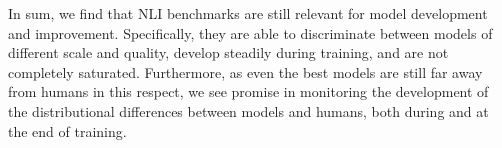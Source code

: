 In sum, we find that NLI benchmarks are still relevant for model development and improvement.
Specifically, they are able to discriminate between models of different scale and quality, develop steadily during training, and are not completely saturated.
Furthermore, as even the best models are still far away from humans in this respect, we see promise in monitoring the development of the distributional differences between models and humans, both during and at the end of training.

